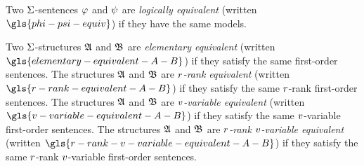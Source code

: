 
Two $\mathrm{\Sigma}$-sentences $\varphi$ and $\psi$ are \emph{logically equivalent}
(written $\gls{phi-psi-equiv}$) if they have the same models.

Two $\mathrm{\Sigma}$-structures $\mathfrak{A}$ and
$\mathfrak{B}$ are \emph{elementary equivalent} (written
$\gls{elementary-equivalent-A-B}$) if they satisfy the same first-order
sentences.
The structures $\mathfrak{A}$ and $\mathfrak{B}$ are \emph{$r$-rank equivalent} (written
$\gls{r-rank-equivalent-A-B}$) if they satisfy the same $r$-rank first-order
sentences.
The structures $\mathfrak{A}$ and $\mathfrak{B}$ are \emph{$v$-variable equivalent} (written
$\gls{v-variable-equivalent-A-B}$) if they satisfy the same $v$-variable
first-order sentences.
The structures $\mathfrak{A}$ and $\mathfrak{B}$ are \emph{$r$-rank $v$-variable
equivalent} (written $\gls{r-rank-v-variable-equivalent-A-B}$) if they satisfy
the same $r$-rank $v$-variable first-order sentences.